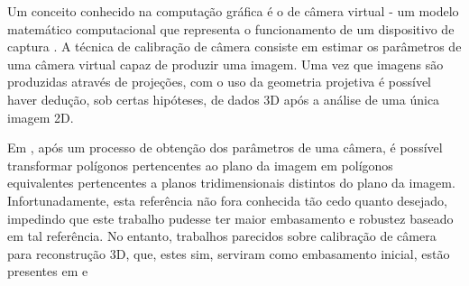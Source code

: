 		Um conceito conhecido na computação gráfica é o de câmera virtual - um modelo matemático computacional que representa o funcionamento de um dispositivo de captura \cite{fundCompGraf}. A técnica de calibração de câmera consiste em estimar os parâmetros de uma câmera virtual capaz de produzir uma imagem. Uma vez que imagens são produzidas através de projeções, com o uso da geometria projetiva é possível haver dedução, sob certas hipóteses, de dados 3D após a análise de uma única imagem 2D.
		
		Em \cite{3DFromLineDrawings}, após um processo de obtenção dos parâmetros de uma câmera, é possível transformar polígonos pertencentes ao plano da imagem em polígonos equivalentes pertencentes a planos tridimensionais distintos do plano da imagem. Infortunadamente, esta referência não fora conhecida tão cedo quanto desejado, impedindo que este trabalho pudesse ter maior embasamento e robustez baseado em tal referência. No entanto, trabalhos parecidos sobre calibração de câmera para reconstrução 3D, que, estes sim, serviram como embasamento inicial, estão presentes em \cite{juizVirtual} e \cite{szenbergDoutorado}